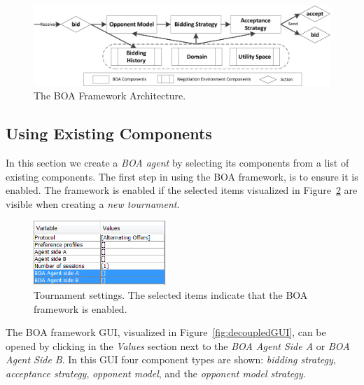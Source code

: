 \documentclass[]{article}
\begin{document}
\begin{figure}[t] 
	\center
	\includegraphics[width=14cm]{media/Decoupled_FlowChart.png}
	\caption{The BOA Framework Architecture.}
	\label{fig:flowchart}
\end{figure}

\subsection{Using Existing Components}
In this section we create a \textit{BOA agent} by selecting its components from a list of existing components. The first step in using the BOA framework, is to ensure it is enabled. The framework is enabled if the selected items visualized in Figure~\ref{fig:settings} are visible when creating a \textit{new tournament}.%

\begin{figure}[h!]
	\center
	\includegraphics[width=5cm]{media/Decoupled_TournamentSettings.png}
	\caption{Tournament settings. The selected items indicate that the BOA framework is enabled.}
	\label{fig:settings}
\end{figure}

The BOA framework GUI, visualized in Figure~\ref{fig:decoupledGUI}, can be opened by clicking in the \textit{Values} section next to the \textit{BOA Agent Side A} or \textit{BOA Agent Side B}. In this GUI four component types are shown: \textit{bidding strategy}, \textit{acceptance strategy}, \textit{opponent model}, and the \textit{opponent model strategy}.
\end{document}
